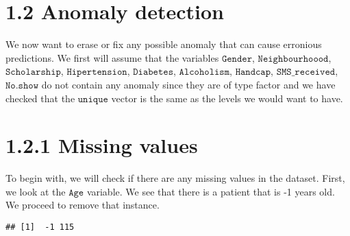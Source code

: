 \documentclass[]{article}
\newenvironment{Shaded}{\begin{snugshade}}{\end{snugshade}}
\newcommand{\KeywordTok}[1]{\textcolor[rgb]{0.13,0.29,0.53}{\textbf{#1}}}
\newcommand{\DecValTok}[1]{\textcolor[rgb]{0.00,0.00,0.81}{#1}}
\newcommand{\StringTok}[1]{\textcolor[rgb]{0.31,0.60,0.02}{#1}}
\newcommand{\OperatorTok}[1]{\textcolor[rgb]{0.81,0.36,0.00}{\textbf{#1}}}
\newcommand{\NormalTok}[1]{#1}
\begin{document}
\section{1.2 Anomaly detection}\label{anomaly-detection}

We now want to erase or fix any possible anomaly that can cause
erronious predictions. We first will assume that the variables
\(\texttt{Gender}\), \(\texttt{Neighbourhoood}\),
\(\texttt{Scholarship}\), \(\texttt{Hipertension}\),
\(\texttt{Diabetes}\), \(\texttt{Alcoholism}\), \(\texttt{Handcap}\),
\(\texttt{SMS_received}\), \(\texttt{No.show}\) do not contain any
anomaly since they are of type factor and we have checked that the
\(\texttt{unique}\) vector is the same as the levels we would want to
have.

\section{1.2.1 Missing values}\label{missing-values}

To begin with, we will check if there are any missing values in the
dataset. First, we look at the \(\texttt{Age}\) variable. We see that
there is a patient that is -1 years old. We proceed to remove that
instance.

\begin{Shaded}
\end{Shaded}

\begin{verbatim}
## [1]  -1 115
\end{verbatim}

\begin{Shaded}
\end{Shaded}
\end{document}
